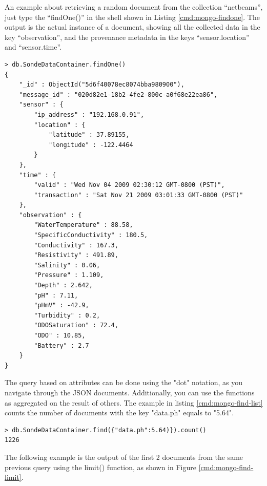An example about retrieving a random document from the collection ``netbeams'',
just type the ``findOne()'' in the shell shown in Listing
\ref{cmd:mongo-findone}. The output is the actual instance of a document,
showing all the collected data in the key ``observation'', and the provenance
metadata in the keys ``sensor.location'' and ``sensor.time''.

\lstset{label=cmd:mongo-findone,caption=Querying the database: one item}
\begin{lstlisting}
> db.SondeDataContainer.findOne()
{
    "_id" : ObjectId("5d6f40078ec8074bba980900"),
    "message_id" : "020d82e1-18b2-4fe2-800c-a0f68e22ea86",
    "sensor" : {
        "ip_address" : "192.168.0.91",
        "location" : {
            "latitude" : 37.89155,
            "longitude" : -122.4464
        }
    },
    "time" : {
        "valid" : "Wed Nov 04 2009 02:30:12 GMT-0800 (PST)",
        "transaction" : "Sat Nov 21 2009 03:01:33 GMT-0800 (PST)"
    },
    "observation" : {
        "WaterTemperature" : 88.58,
        "SpecificConductivity" : 180.5,
        "Conductivity" : 167.3,
        "Resistivity" : 491.89,
        "Salinity" : 0.06,
        "Pressure" : 1.109,
        "Depth" : 2.642,
        "pH" : 7.11,
        "pHmV" : -42.9,
        "Turbidity" : 0.2,
        "ODOSaturation" : 72.4,
        "ODO" : 10.85,
        "Battery" : 2.7
    }
}
\end{lstlisting}

The query based on attributes can be done using the "dot" notation, as you
navigate through the JSON documents. Additionally, you can use the functions
as aggregated on the result of others. The example in listing
\ref{cmd:mongo-find-list} counts the number of documents with the key
"data.ph" equals to "5.64".

\lstset{label=cmd:mongo-find-list,caption=Execution of mongo client}
\begin{lstlisting}
> db.SondeDataContainer.find({"data.ph":5.64)}).count()
1226
\end{lstlisting}

The following example is the output of the first 2 documents from the same
previous query using the limit() function, as shown in Figure
\ref{cmd:mongo-find-limit}.

